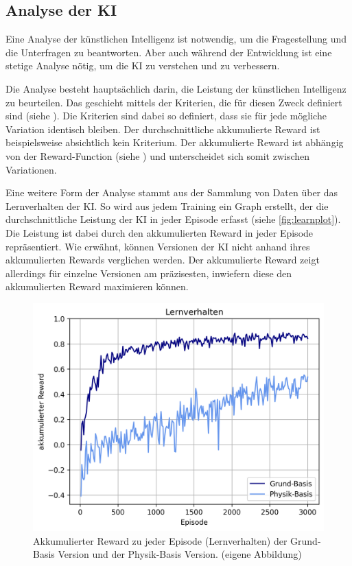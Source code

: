 \subsection{Analyse der KI}\label{sub:d_reflex_analys}
Eine Analyse der künstlichen Intelligenz ist notwendig, um die Fragestellung und die
Unterfragen zu beantworten. Aber auch während der Entwicklung ist eine
stetige Analyse nötig, um die KI zu verstehen und zu verbessern.
 
Die Analyse besteht hauptsächlich darin, die Leistung der künstlichen
Intelligenz zu beurteilen. Das geschieht mittels der Kriterien, die für diesen
Zweck definiert sind (siehe ). Die Kriterien sind dabei so
definiert, dass sie für jede mögliche Variation identisch bleiben. Der
durchschnittliche akkumulierte Reward ist beispielsweise absichtlich kein
Kriterium. Der akkumulierte Reward ist abhängig von der Reward-Function (siehe
) und unterscheidet sich somit zwischen Variationen.
 
Eine weitere Form der Analyse stammt aus der Sammlung von Daten über das
Lernverhalten der KI. So wird aus jedem Training ein Graph erstellt, der die
durchschnittliche Leistung der KI in jeder Episode erfasst (siehe
\autoref{fig:learnplot}). Die Leistung ist dabei durch den akkumulierten Reward
in jeder Episode repräsentiert. Wie erwähnt, können Versionen der KI nicht
anhand ihres akkumulierten Rewards verglichen werden. Der akkumulierte Reward
zeigt allerdings für einzelne Versionen am präzisesten, inwiefern diese den
akkumulierten Reward maximieren können.

\newpage 
\begin{figure}[!ht]
   \centering
   \includegraphics[width=\textwidth-2cm]{images/diskussion/learnplot.png}
   \caption{Akkumulierter Reward zu jeder Episode (Lernverhalten) der Grund-Basis Version und der Physik-Basis Version. (eigene Abbildung)}\label{fig:learnplot}
\end{figure}
 
